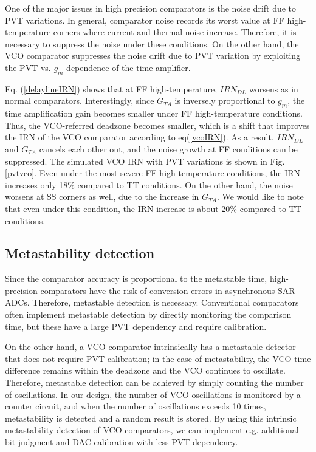 \documentclass[letterpaper, 10 pt, conference]{ieeeconf}  %
\begin{document}
One of the major issues in high precision comparators is the noise drift due to PVT variations. In general, comparator noise records its worst value at  FF high-temperature corners where current and thermal noise increase. Therefore, it is necessary to suppress the noise under these conditions. On the other hand, the VCO comparator suppresses the noise drift due to PVT variation by exploiting the PVT vs. $g_m$ dependence of the time amplifier.

Eq. (\ref{delaylineIRN}) shows that at FF high-temperature, $IRN_{DL}$ worsens as in normal comparators.
Interestingly, since $G_{TA}$ is inversely proportional to $g_m$, the time amplification gain becomes smaller under FF high-temperature conditions. Thus, the VCO-referred deadzone becomes smaller, which is a shift that improves the IRN of the VCO comparator according to eq(\ref{vcoIRN}). As a result, $IRN_{DL}$ and $G_{TA}$ cancels each other out, and the noise growth at FF conditions can be suppressed. The simulated VCO IRN with PVT variations is shown in Fig.\ref{pvtvco}. Even under the most severe FF high-temperature conditions, the IRN increases only 18\% compared to TT conditions. On the other hand, the noise worsens at SS corners as well, due to the increase in $G_{TA}$. We would like to note that even under this condition, the IRN increase is about 20\% compared to TT conditions.

\subsection{Metastability detection}
Since the comparator accuracy is proportional to the metastable time, high-precision comparators have the risk of conversion errors in asynchronous SAR ADCs. Therefore, metastable detection is necessary.
Conventional comparators often implement metastable detection by directly monitoring the comparison time, but these have a large PVT dependency and require calibration\cite{shikata20120}.

On the other hand, a VCO comparator intrinsically has a metastable detector that does not require PVT calibration; in the case of metastability, the VCO time difference remains within the deadzone and the VCO continues to oscillate. Therefore, metastable detection can be achieved by simply counting the number of oscillations. In our design, the number of VCO oscillations is monitored by a counter circuit, and when the number of oscillations exceeds 10 times, metastability is detected and a random result is stored. By using this intrinsic metastability detection of VCO comparators, we can implement e.g. additional bit judgment \cite{shikata20120,ding20190} and DAC calibration \cite{zhu201914} with less PVT dependency.
\end{document}
